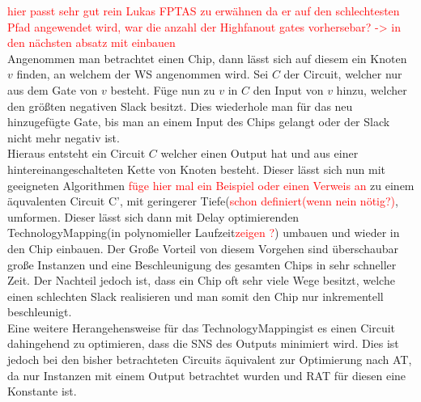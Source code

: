 \documentclass[11pt, a4paper, german]{article}
\newcommand{\TM}{TechnologyMapping}
\begin{document}
\textcolor{red}{hier passt sehr gut rein Lukas FPTAS zu erwähnen da er auf den schlechtesten Pfad angewendet wird, war die anzahl der Highfanout gates vorhersebar? -> in den nächsten absatz mit einbauen}\\

Angenommen man betrachtet einen Chip, dann lässt sich auf diesem ein Knoten $v$ finden, an welchem der WS angenommen wird. Sei $C$ der Circuit, welcher nur aus dem Gate von $v$ besteht. Füge nun zu $v$ in $C$ den Input von $v$ hinzu, welcher den größten negativen Slack besitzt. Dies wiederhole man für das neu hinzugefügte Gate, bis man an einem Input des Chips gelangt oder der Slack nicht mehr negativ ist. \\
Hieraus entsteht ein Circuit $C$ welcher einen Output hat und aus einer hintereinangeschalteten Kette von Knoten besteht. Dieser lässt sich nun mit geeigneten Algorithmen \textcolor{red}{füge hier mal ein Beispiel oder einen Verweis an} zu einem äquvalenten Circuit C', mit geringerer Tiefe(\textcolor{red}{schon definiert(wenn nein nötig?)}, umformen. Dieser lässt sich dann mit  Delay optimierenden \TM (in polynomieller Laufzeit\textcolor{red}{zeigen ?}) umbauen und wieder in den Chip einbauen. Der Große Vorteil von diesem Vorgehen sind überschaubar große Instanzen und eine Beschleunigung des gesamten Chips in sehr schneller Zeit. Der Nachteil jedoch ist, dass ein Chip oft sehr viele Wege besitzt, welche einen schlechten Slack realisieren und man somit den Chip nur inkrementell beschleunigt.\\

Eine weitere Herangehensweise für das \TM ist es einen Circuit dahingehend zu optimieren, dass die SNS des Outputs minimiert wird. Dies ist jedoch bei den bisher betrachteten Circuits äquivalent zur Optimierung nach AT, da nur Instanzen mit einem Output betrachtet wurden und RAT für diesen eine Konstante ist.
\end{document}
